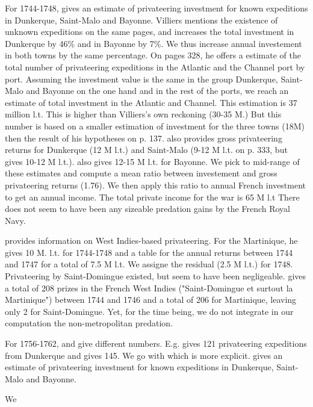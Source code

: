 \documentclass[12pt,a4paper,notitlepage,english]{article}
\begin{document}
\begin{appendix}
For 1744-1748, \cite[p. 327]{Villiers1991} gives an estimate of privateering investment for known expeditions in Dunkerque, Saint-Malo and Bayonne.
Villiers mentions the existence of unknown expeditions on the same pages, and increases the total investment in Dunkerque by 46\% and in Bayonne by 7\%.
We thus increase annual investement in both towns by the same percentage.
On pages 328, he offers a estimate of the total number of privateering expeditions in the Atlantic and the Channel port by port.
Assuming the investment value is the same in the group Dunkerque, Saint-Malo and Bayonne on the one hand and in the rest of the ports, we  reach an estimate of total investment in the Atlantic and Channel.
This estimation is 37 million l.t.
This is higher than Villiers’s own reckoning (30-35 M.) But this number is based on a smaller estimation of investment for the three towns (18M) then the result of his hypotheses on p. 137.
\cite[p. 332]{Villiers1991} also provides gross privateering returns for Dunkerque (12 M l.t.) and Saint-Malo (9-12 M l.t. on p. 333, but \cite[p. 43]{Villiers2007} gives 10-12 M l.t.). 
\cite[p. 43]{Villiers2007} also gives 12-15 M l.t. for Bayonne.
We pick to mid-range of these estimates and compute a mean ratio between investement and gross privateering returns (1.76).
We then apply this ratio to annual French investment to get an annual income.
The total private income for the war is 65 M l.t
There does not seem to have been any sizeable predation gains by the French Royal Navy.

\cite[p. 43]{Villiers2007} provides information on West Indies-based privateering.
For the Martinique, he gives 10 M. l.t. for 1744-1748 and a table for the annual returns between 1744 and 1747 for a total of 7.5 M l.t. 
We assigne the residual (2.5 M l.t.) for 1748.
Privateering by Saint-Domingue existed, but seem to have been negligeable.
\cite[p. 43]{Villiers2007} gives a total of 208 prizes in the French West Indies ("Saint-Domingue et surtout la Martinique") between 1744 and 1746 and a total of 206 for Martinique, leaving only 2 for Saint-Domingue.
Yet, for the time being, we do not integrate in our computation the non-metropolitan predation.

For 1756-1762, \cite{Villiers1991} and \cite{Villiers2007} give different numbers.
E.g. \cite[p.45]{Villiers2007} gives 121 privateering expeditions from Dunkerque and \cite[p. 35]{Villiers1991} gives 145.
We go with \cite{Villiers1991} which is more explicit.
\cite[p. 355]{Villiers1991} gives an estimate of privateering investment for known expeditions in Dunkerque, Saint-Malo and Bayonne.

We  




\end{appendix}

\tableofcontents

\listoftodos[Notes]
\end{document}
